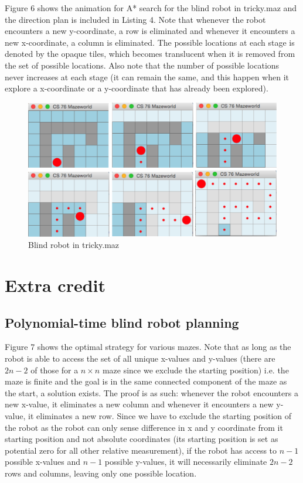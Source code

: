 \documentclass[9.5pt]{extarticle}
\begin{document}
Figure 6 shows the animation for A* search for the blind robot in tricky.maz and the direction plan is included in Listing 4. Note that whenever the robot encounters a new y-coordinate, a row is eliminated and whenever it encounters a new x-coordinate, a column is eliminated. The possible locations at each stage is denoted by the opaque tiles, which becomes translucent when it is removed from the set of possible locations. Also note that the number of possible locations never increases at each stage (it can remain the same, and this happen when it explore a x-coordinate or a y-coordinate that has already been explored).\\

\begin{figure}[H]
\centering
\includegraphics[scale=0.5]{tricky_blind.png}
\caption{Blind robot in tricky.maz }
\label{Figure 5}
\end{figure}

\section{Extra credit}

\subsection{Polynomial-time blind robot planning}

Figure 7 shows the optimal strategy for various mazes. Note that as long as the robot is able to access the set of all unique x-values and y-values (there are $2n-2$ of those for a $n\times n$ maze since we exclude the starting position) i.e. the maze is finite and the goal is in the same connected component of the maze as the start, a solution exists. The proof is as such: whenever the robot encounters a new x-value, it eliminates a new column and whenever it encounters a new y-value, it eliminates a new row. Since we have to exclude the starting position of the robot as the robot can only sense difference in x and y coordinate from it starting position and not absolute coordinates (its starting position is set as potential zero for all other relative measurement), if the robot has access to $n-1$ possible x-values and $n-1$ possible y-values, it will necessarily eliminate $2n- 2$ rows and columns, leaving only one possible location.
\end{document}
